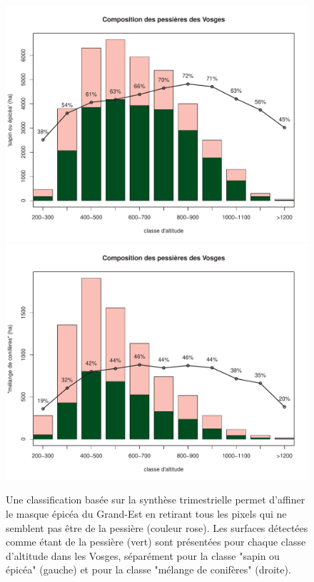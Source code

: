 \documentclass[a4paper, 12pt]{article} %
\begin{document}
\begin{figure}
	\centering
	\includegraphics[width=0.49\linewidth]{compoEPorS.pdf}
	\includegraphics[width=0.49\linewidth]{compoResineux.pdf}
	\caption{Une classification basée sur la synthèse trimestrielle permet d'affiner le masque épicéa du Grand-Est en retirant tous les pixels qui ne semblent pas être de la pessière (couleur rose). Les surfaces détectées comme étant de la pessière (vert) sont présentées pour chaque classe d'altitude dans les Vosges, séparément pour la classe "sapin ou épicéa" (gauche) et pour la classe "mélange de conifères" (droite).}
	\label{fig:reclasEP}
\end{figure}


%


\end{document}
